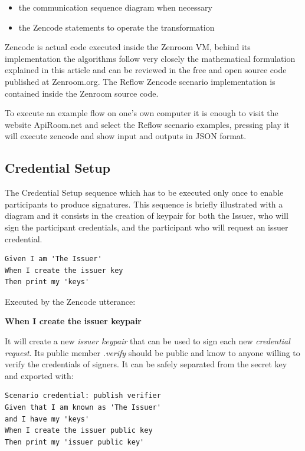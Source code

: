 \documentclass[twocolumn]{article}
\begin{document}
\begin{itemize}
  \item the communication sequence diagram when necessary
  \item the Zencode statements to operate the transformation
\end{itemize}

Zencode is actual code executed inside the Zenroom VM, behind its
implementation the algorithms follow very closely the mathematical
formulation explained in this article and can be reviewed in the free
and open source code published at Zenroom.org. The Reflow Zencode
scenario implementation is contained inside the Zenroom source code.

To execute an example flow on one's own computer it is enough to visit
the website ApiRoom.net and select the Reflow scenario examples,
pressing play it will execute zencode and show input and outputs in
JSON format.

\subsection*{Credential Setup}

The Credential Setup sequence which has to be executed only once to
enable participants to produce signatures. This sequence is briefly
illustrated with a diagram and it consists in the creation of keypair
for both the Issuer, who will sign the participant credentials, and
the participant who will request an issuer credential.

\begin{lstlisting}[style=zencode,caption={Issuer Keygen}]
Given I am 'The Issuer'
When I create the issuer key
Then print my 'keys'  
\end{lstlisting}

Executed by the Zencode utterance:

\textbf{When I create the issuer keypair}

It will create a new \emph{issuer keypair} that can be used to sign
each new \emph{credential request}. Its public member \emph{.verify}
should be public and know to anyone willing to verify the credentials
of signers. It can be safely separated from the secret key and
exported with:

\begin{lstlisting}[style=zencode,caption={Issuer verifier}]
Scenario credential: publish verifier
Given that I am known as 'The Issuer'
and I have my 'keys'
When I create the issuer public key
Then print my 'issuer public key'
\end{lstlisting}
\end{document}
